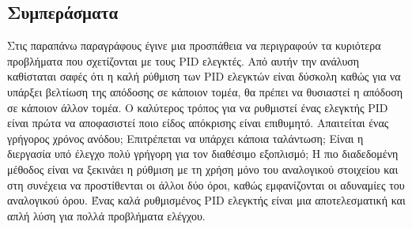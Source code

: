 \subsection{Συμπεράσματα}

Στις παραπάνω παραγράφους έγινε μια προσπάθεια να περιγραφούν τα κυριότερα προβλήματα που σχετίζονται με τους PID ελεγκτές. Από αυτήν την ανάλυση καθίσταται σαφές ότι η καλή ρύθμιση των PID ελεγκτών είναι δύσκολη καθώς για να υπάρξει βελτίωση της απόδοσης σε κάποιον τομέα, θα πρέπει να θυσιαστεί η απόδοση σε κάποιον άλλον τομέα. Ο καλύτερος τρόπος για να ρυθμιστεί ένας ελεγκτής PID είναι πρώτα να αποφασιστεί ποιο είδος απόκρισης είναι επιθυμητό. Απαιτείται ένας γρήγορος χρόνος ανόδου; Επιτρέπεται να υπάρχει κάποια ταλάντωση; Είναι η διεργασία υπό έλεγχο πολύ γρήγορη για τον διαθέσιμο εξοπλισμό; Η πιο διαδεδομένη μέθοδος είναι να ξεκινάει η ρύθμιση με τη χρήση μόνο του αναλογικού στοιχείου και στη συνέχεια να προστίθενται οι άλλοι δύο όροι, καθώς εμφανίζονται οι αδυναμίες του αναλογικού όρου. Ένας καλά ρυθμισμένος PID ελεγκτής είναι μια αποτελεσματική και απλή λύση για πολλά προβλήματα ελέγχου.




